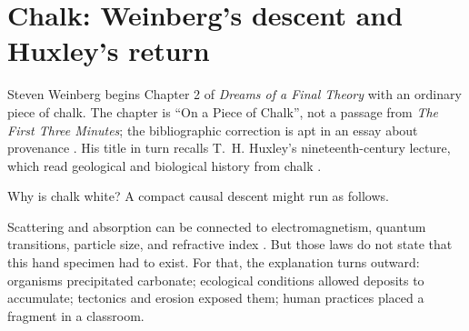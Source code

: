 \section{Chalk: Weinberg's descent and Huxley's return}

Steven Weinberg begins Chapter 2 of \emph{Dreams of a Final Theory} with an ordinary piece of chalk. The chapter is ``On a Piece of Chalk'', not a passage from \emph{The First Three Minutes}; the bibliographic correction is apt in an essay about provenance \citep{weinberg1992}. His title in turn recalls T.~H. Huxley's nineteenth-century lecture, which read geological and biological history from chalk \citep{huxley1868}.

Why is chalk white? A compact causal descent might run as follows.

\begin{center}
\end{center}

Scattering and absorption can be connected to electromagnetism, quantum transitions, particle size, and refractive index \citep{bohren1983}. But those laws do not state that this hand specimen had to exist. For that, the explanation turns outward: organisms precipitated carbonate; ecological conditions allowed deposits to accumulate; tectonics and erosion exposed them; human practices placed a fragment in a classroom.

